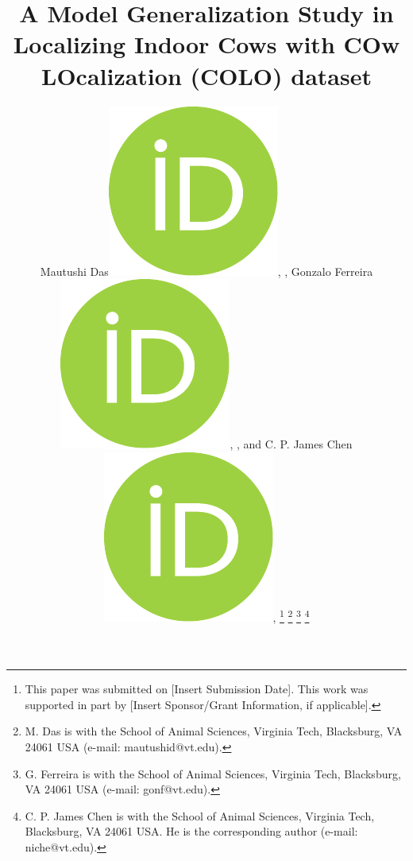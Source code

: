\documentclass[journal,twoside,web]{ieeecolor}
\begin{document}
\title{A Model Generalization Study in Localizing Indoor Cows with COw LOcalization (COLO) dataset}


\author{
    Mautushi Das\href{https://orcid.org/0009-0001-8932-142X}{\includegraphics[scale=0.06]{orcid.pdf}}, ,
    Gonzalo Ferreira\href{https://orcid.org/0000-0002-8254-8090}{\includegraphics[scale=0.06]{orcid.pdf}}, , and 
    C. P. James Chen\href{https://orcid.org/0000-0002-2018-0702}{\includegraphics[scale=0.06]{orcid.pdf}}, %
    \thanks{This paper was submitted on [Insert Submission Date]. This work was supported in part by [Insert Sponsor/Grant Information, if applicable].}
    \thanks{M. Das is with the School of Animal Sciences, Virginia Tech, Blacksburg, VA 24061 USA (e-mail: mautushid@vt.edu).}
    \thanks{G. Ferreira is with the School of Animal Sciences, Virginia Tech, Blacksburg, VA 24061 USA (e-mail: gonf@vt.edu).}
    \thanks{C. P. James Chen is with the School of Animal Sciences, Virginia Tech, Blacksburg, VA 24061 USA. He is the corresponding author (e-mail: niche@vt.edu).}
}
\end{document}
